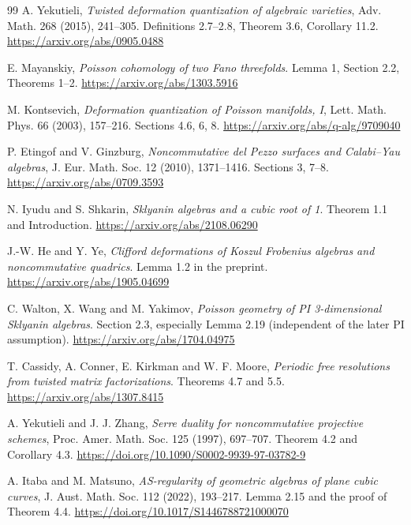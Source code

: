 \documentclass[a4paper,11pt]{ltjsarticle}
\theoremstyle{definition}
\begin{document}





\begin{thebibliography}{99}
\small
{}
A. Yekutieli,
\emph{Twisted deformation quantization of algebraic varieties},
Adv. Math. 268 (2015), 241--305.
Definitions 2.7--2.8, Theorem 3.6, Corollary 11.2.
\url{https://arxiv.org/abs/0905.0488}

E. Mayanskiy,
\emph{Poisson cohomology of two Fano threefolds}.
Lemma 1, Section 2.2, Theorems 1--2.
\url{https://arxiv.org/abs/1303.5916}

M. Kontsevich,
\emph{Deformation quantization of Poisson manifolds, I},
Lett. Math. Phys. 66 (2003), 157--216.
Sections 4.6, 6, 8.
\url{https://arxiv.org/abs/q-alg/9709040}

P. Etingof and V. Ginzburg,
\emph{Noncommutative del Pezzo surfaces and Calabi--Yau algebras},
J. Eur. Math. Soc. 12 (2010), 1371--1416.
Sections 3, 7--8.
\url{https://arxiv.org/abs/0709.3593}

N. Iyudu and S. Shkarin,
\emph{Sklyanin algebras and a cubic root of 1}.
Theorem 1.1 and Introduction.
\url{https://arxiv.org/abs/2108.06290}

J.-W. He and Y. Ye,
\emph{Clifford deformations of Koszul Frobenius algebras and noncommutative quadrics}.
Lemma 1.2 in the preprint.
\url{https://arxiv.org/abs/1905.04699}

C. Walton, X. Wang and M. Yakimov,
\emph{Poisson geometry of PI 3-dimensional Sklyanin algebras}.
Section 2.3, especially Lemma 2.19 (independent of the later PI assumption).
\url{https://arxiv.org/abs/1704.04975}

T. Cassidy, A. Conner, E. Kirkman and W. F. Moore,
\emph{Periodic free resolutions from twisted matrix factorizations}.
Theorems 4.7 and 5.5.
\url{https://arxiv.org/abs/1307.8415}

A. Yekutieli and J. J. Zhang,
\emph{Serre duality for noncommutative projective schemes},
Proc. Amer. Math. Soc. 125 (1997), 697--707.
Theorem 4.2 and Corollary 4.3.
\url{https://doi.org/10.1090/S0002-9939-97-03782-9}

A. Itaba and M. Matsuno,
\emph{AS-regularity of geometric algebras of plane cubic curves},
J. Aust. Math. Soc. 112 (2022), 193--217.
Lemma 2.15 and the proof of Theorem 4.4.
\url{https://doi.org/10.1017/S1446788721000070}


\end{thebibliography}
\end{document}
